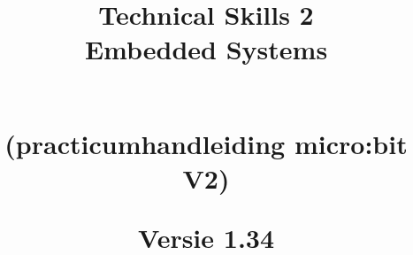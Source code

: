 \documentclass[12pt,openright,twoside]{report}
\date{}
\title{

{\vspace{-4cm}}
	{\hspace{-20pt}\begin{bfseries}\Huge{\color{black}Technical Skills 2 \\Embedded Systems} \end{bfseries}  } \\
	{(practicumhandleiding micro:bit V2)}
\ThisCenterWallPaper{0.8}{figuren/bbcmicrobitV2.png}

	{\vspace{18cm}}	
	{\color{white}  
	\raggedleft  \par}
	Versie 1.34

}
\begin{document}
\maketitle

 \tableofcontents

\let\cleardoublepage\clearpage


%

%



%
%
%






\end{document}

